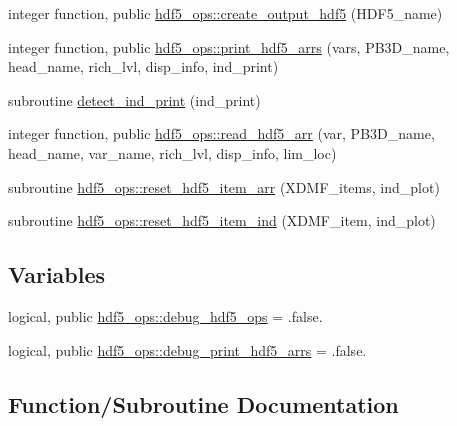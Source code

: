 \begin{DoxyCompactItemize}
\item 
integer function, public \hyperlink{namespacehdf5__ops_a1263636fffc4f4aa86f72bd5fd3352a0}{hdf5\+\_\+ops\+::create\+\_\+output\+\_\+hdf5} (H\+D\+F5\+\_\+name)
\item 
integer function, public \hyperlink{namespacehdf5__ops_a18a07099350020b44d6fbe93ed36e804}{hdf5\+\_\+ops\+::print\+\_\+hdf5\+\_\+arrs} (vars, P\+B3\+D\+\_\+name, head\+\_\+name, rich\+\_\+lvl, disp\+\_\+info, ind\+\_\+print)
\item 
subroutine \hyperlink{HDF5__ops_8f90_a9ce89bbcdaf88002bfab4d531536c989}{detect\+\_\+ind\+\_\+print} (ind\+\_\+print)
\item 
integer function, public \hyperlink{namespacehdf5__ops_a5108e0d6f6b492cb981505ebceedd9ee}{hdf5\+\_\+ops\+::read\+\_\+hdf5\+\_\+arr} (var, P\+B3\+D\+\_\+name, head\+\_\+name, var\+\_\+name, rich\+\_\+lvl, disp\+\_\+info, lim\+\_\+loc)
\item 
subroutine \hyperlink{namespacehdf5__ops_aed5661fcfa44910873fc0f87bb6ed914}{hdf5\+\_\+ops\+::reset\+\_\+hdf5\+\_\+item\+\_\+arr} (X\+D\+M\+F\+\_\+items, ind\+\_\+plot)
\item 
subroutine \hyperlink{namespacehdf5__ops_a0f8db30a23145c71cb14906e7557cc33}{hdf5\+\_\+ops\+::reset\+\_\+hdf5\+\_\+item\+\_\+ind} (X\+D\+M\+F\+\_\+item, ind\+\_\+plot)
\end{DoxyCompactItemize}
\subsection*{Variables}
\begin{DoxyCompactItemize}
\item 
logical, public \hyperlink{namespacehdf5__ops_a9b7c63811a63e9454539f1a2c89678b4}{hdf5\+\_\+ops\+::debug\+\_\+hdf5\+\_\+ops} = .false.
\item 
logical, public \hyperlink{namespacehdf5__ops_a00bbaa77652e040350c9726668cc22ac}{hdf5\+\_\+ops\+::debug\+\_\+print\+\_\+hdf5\+\_\+arrs} = .false.
\end{DoxyCompactItemize}


\subsection{Function/\+Subroutine Documentation}
\mbox{\label{HDF5__ops_8f90_a80c977815900dc90dfb63bc20a2abb5e}} 
